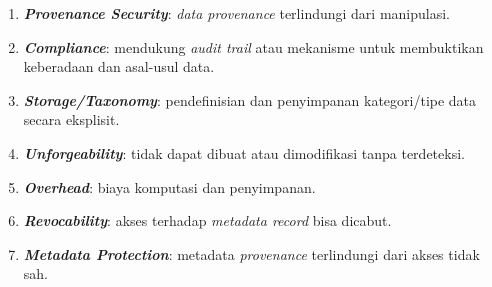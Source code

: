 \begin{enumerate}
    \item \textbf{\textit{Provenance Security}}: \textit{data provenance} terlindungi dari manipulasi.
    \item \textbf{\textit{Compliance}}: mendukung \textit{audit trail} atau mekanisme untuk membuktikan keberadaan dan asal-usul data.
    \item \textbf{\textit{Storage/Taxonomy}}: pendefinisian dan penyimpanan kategori/tipe data secara eksplisit.
    \item \textbf{\textit{Unforgeability}}: tidak dapat dibuat atau dimodifikasi tanpa terdeteksi.
    \item \textbf{\textit{Overhead}}: biaya komputasi dan penyimpanan.
    \item \textbf{\textit{Revocability}}: akses terhadap \textit{metadata record} bisa dicabut.
    \item \textbf{\textit{Metadata Protection}}: metadata \textit{provenance} terlindungi dari akses tidak sah.
\end{enumerate}
